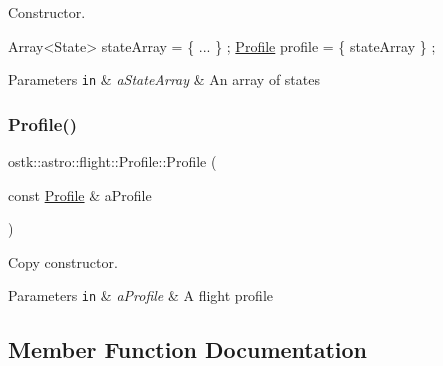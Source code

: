 Constructor. 


\begin{DoxyCode}
Array<State> stateArray = \{ ... \} ;
\hyperlink{classostk_1_1astro_1_1flight_1_1_profile_a80fbc6a3773a6f2790b84c4ddb306d07}{Profile} profile = \{ stateArray \} ;
\end{DoxyCode}



\begin{DoxyParams}[1]{Parameters}
\mbox{\tt in}  & {\em a\+State\+Array} & An array of states \\
\hline
\end{DoxyParams}
\mbox{\label{classostk_1_1astro_1_1flight_1_1_profile_abe183d12e41b513da461cd8a7d5067e8}} 
\subsubsection{\texorpdfstring{Profile()}{Profile()}\hspace{0.1cm}{\footnotesize\ttfamily [3/3]}}
{\footnotesize\ttfamily ostk\+::astro\+::flight\+::\+Profile\+::\+Profile (\begin{DoxyParamCaption}\item[{const \hyperlink{classostk_1_1astro_1_1flight_1_1_profile}{Profile} \&}]{a\+Profile }\end{DoxyParamCaption})\hspace{0.3cm}{\ttfamily [default]}}



Copy constructor. 


\begin{DoxyParams}[1]{Parameters}
\mbox{\tt in}  & {\em a\+Profile} & A flight profile \\
\hline
\end{DoxyParams}


\subsection{Member Function Documentation}
\mbox{\label{classostk_1_1astro_1_1flight_1_1_profile_a04d4ef9a89d42586e8a782d1af9ee031}} 

